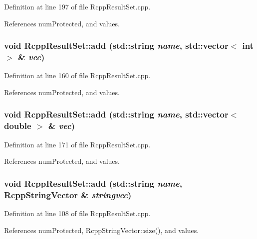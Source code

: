 Definition at line 197 of file RcppResultSet.cpp.

References numProtected, and values.\hypertarget{classRcppResultSet_a23fa5be81281adcf3014749094816522}{
\subsubsection[{add}]{\setlength{\rightskip}{0pt plus 5cm}void RcppResultSet::add (std::string {\em name}, \/  std::vector$<$ int $>$ \& {\em vec})}}
\label{classRcppResultSet_a23fa5be81281adcf3014749094816522}


Definition at line 160 of file RcppResultSet.cpp.

References numProtected, and values.\hypertarget{classRcppResultSet_a2b4575ca5ccc390bc5437b1be4718ca6}{
\subsubsection[{add}]{\setlength{\rightskip}{0pt plus 5cm}void RcppResultSet::add (std::string {\em name}, \/  std::vector$<$ double $>$ \& {\em vec})}}
\label{classRcppResultSet_a2b4575ca5ccc390bc5437b1be4718ca6}


Definition at line 171 of file RcppResultSet.cpp.

References numProtected, and values.\hypertarget{classRcppResultSet_a10d01a24ef006c1ff14ca7e95fb9e0ea}{
\subsubsection[{add}]{\setlength{\rightskip}{0pt plus 5cm}void RcppResultSet::add (std::string {\em name}, \/  {\bf RcppStringVector} \& {\em stringvec})}}
\label{classRcppResultSet_a10d01a24ef006c1ff14ca7e95fb9e0ea}


Definition at line 108 of file RcppResultSet.cpp.

References numProtected, RcppStringVector::size(), and values.

